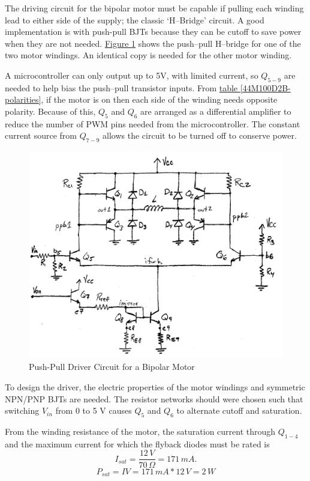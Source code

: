 \documentclass[10pt, twocolumn]{article}
\begin{document}
The driving circuit for the bipolar motor must be capable if pulling 
each winding lead to either side of the supply; the classic
`H--Bridge' circuit.
A good implementation is with push-pull BJTs because they can be
cutoff to save power when they are not needed.
\hyperref[motor-driver-circuit]{Figure \ref{motor-driver-circuit}}
shows the push--pull H--bridge for one of the two motor windings.
An identical copy is needed for the other motor winding.

A microcontroller can only output up to 5V, with limited current, so
$Q_{5-9}$ are needed to help bias the push--pull transistor inputs.
From \hyperref[44M100D2B-polarities]{table \ref{44M100D2B-polarities}},
if the motor is on then each side of the winding needs opposite
polarity. Because of this,
$Q_{5}$ and $Q_{6}$ are arranged as a differential amplifier
to reduce the number of PWM pins needed from the microcontroller.
The constant current source from $Q_{7-9}$ allows the circuit to be turned
off to conserve power.

\begin{figure}
	\centering
	\includegraphics[width=.65\textwidth]{Figures/motor-driver-circuit.pdf}
	\caption{Push-Pull Driver Circuit for a Bipolar Motor}
	\label{motor-driver-circuit}
\end{figure}

To design the driver, the electric properties of the motor windings
and symmetric NPN/PNP BJTs are needed.
The resistor networks should were chosen such that switching $V_{in}$ from
0 to 5 V causes $Q_{5}$ and $Q_{6}$ to alternate cutoff and saturation.

From the winding resistance of the motor, the saturation current through
$Q_{1-4}$ and the maximum current for which the flyback diodes must be rated is
\begin{equation}
I_{sat}=\frac{12\,V}{70\,\Omega}=171\,mA.
\end{equation}
\begin{equation}
P_{sat}=IV=171\,mA*12\,V=2\,W
\end{equation}
\end{document}
